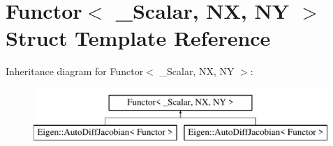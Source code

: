 \hypertarget{struct_functor}{}\section{Functor$<$ \+\_\+\+Scalar, NX, NY $>$ Struct Template Reference}
\label{struct_functor}
Inheritance diagram for Functor$<$ \+\_\+\+Scalar, NX, NY $>$\+:\begin{figure}[H]
\begin{center}
\leavevmode
\includegraphics[height=2.000000cm]{struct_functor}
\end{center}
\end{figure}
